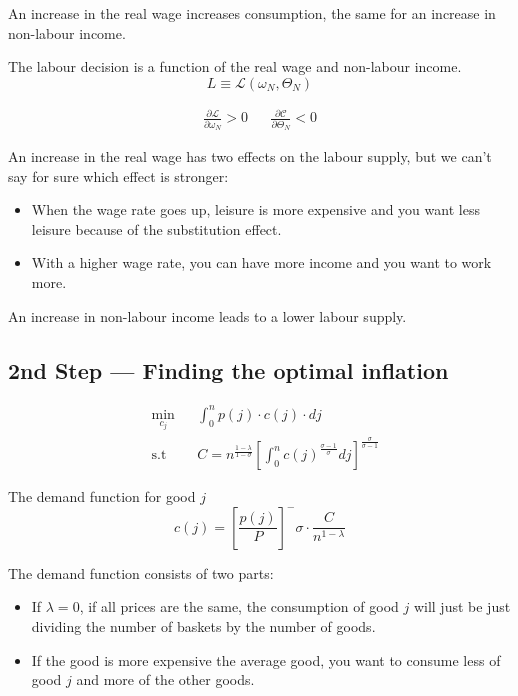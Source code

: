 An increase in the real wage increases consumption, the same for an increase in non-labour income. 



The labour decision is a function of the real wage and non-labour income. 
$$
L \equiv \mathcal{L}\left(\omega_N, \Theta_N  \right)
$$

\begin{align*}
    \frac{\partial \mathcal{L}}{\partial \omega_N} > 0  && \frac{\partial \mathcal{C}}{\partial \Theta_N} < 0
\end{align*}

An increase in the real wage has two effects on the labour supply, but we can't say for sure which effect is stronger: 
\begin{itemize}
    \item When the wage rate goes up, leisure is more expensive and you want less leisure because of the substitution effect. 
    \item With a higher wage rate, you can have more income and you want to work more. 
\end{itemize}

An increase in non-labour income leads to a lower labour supply. 

\subsection*{2nd Step --- Finding the optimal inflation}

\begin{equation*}
\begin{aligned}
& \underset{c_j}{\min}
& & \int _ { 0 } ^ { n } p(j) \cdot c(j) \cdot dj \\
& \text{s.t}
& & C = n^\frac{1 - \lambda}{1 - \sigma}  \left[\int _ { 0 } ^ { n } c(j)^\frac{\sigma - 1}{\sigma} dj     \right]^\frac{\sigma}{\sigma - 1} 
\end{aligned}
\end{equation*}

The demand function for good $j$
$$
c(j) = \left[ \frac{p(j)}{P}  \right]^ - \sigma \cdot \frac{C}{n^{1 - \lambda}}
$$

The demand function consists of two parts:
\begin{itemize}
    \item If $\lambda = 0$, if all prices are the same, the consumption of good $j$ will just be just dividing the number of baskets by the number of goods. 
    \item If the good is more expensive the average good, you want to consume less of good $j$ and more of the other goods.
\end{itemize}


